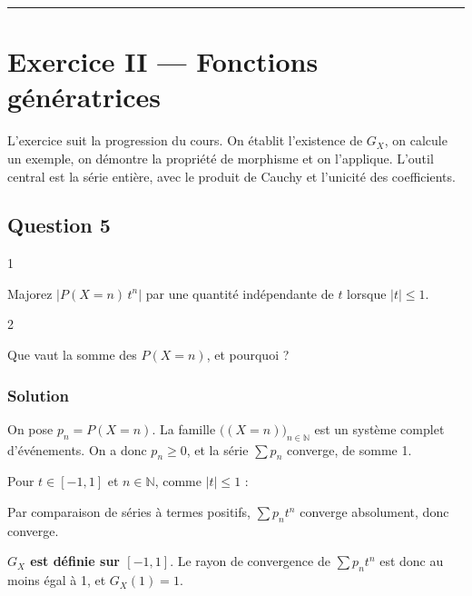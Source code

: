 \documentclass[11pt,a4paper]{article}
\newcommand{\equationajustee}[1]{%
  \sbox{\boiteequation}{$\displaystyle #1$}%
  \ifdim\wd\boiteequation>\linewidth
    \[\resizebox{\linewidth}{!}{\usebox{\boiteequation}}\]%
  \else
    \[#1\]%
  \fi}
\begin{document}
\begin{center}\rule{0.5\linewidth}{0.5pt}\end{center}

\hypertarget{exercice-ii-fonctions-guxe9nuxe9ratrices}{%
\section{Exercice II --- Fonctions génératrices}\label{exercice-ii-fonctions-guxe9nuxe9ratrices}}

L'exercice suit la progression du cours. On établit l'existence de \(G_X\), on calcule un exemple, on démontre la propriété de morphisme et on l'applique. L'outil central est la série entière, avec le produit de Cauchy et l'unicité des coefficients.

\hypertarget{question-5}{%
\subsection{Question 5}\label{question-5}}

\begin{indication}{1}

Majorez \(|P(X=n)\,t^n|\) par une quantité indépendante de \(t\) lorsque \(|t|\le1\).

\end{indication}

\begin{indication}{2}

Que vaut la somme des \(P(X=n)\), et pourquoi ?

\end{indication}

\hypertarget{solution-4}{%
\subsubsection{Solution}\label{solution-4}}

On pose \(p_n=P(X=n)\). La famille \(\big((X=n)\big)_{n\in\mathbb{N}}\) est un système complet d'événements. On a donc \(p_n\ge0\), et la série \(\sum p_n\) converge, de somme 1.

Pour \(t\in[-1,1]\) et \(n\in\mathbb{N}\), comme \(|t|\le1\) :

\equationajustee{|p_nt^n|=p_n|t|^n\le p_n.}

Par comparaison de séries à termes positifs, \(\sum p_nt^n\) converge absolument, donc converge.

\textbf{\(G_X\) est définie sur \([-1,1]\)}. Le rayon de convergence de \(\sum p_nt^n\) est donc au moins égal à 1, et \(G_X(1)=1\).
\end{document}
